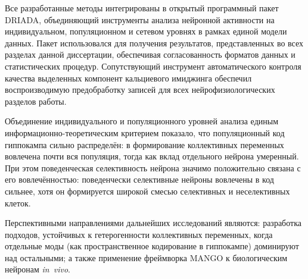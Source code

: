 Все разработанные методы интегрированы в открытый программный пакет DRIADA, объединяющий инструменты анализа нейронной активности на индивидуальном, популяционном и сетевом уровнях в рамках единой модели данных. Пакет использовался для получения результатов, представленных во всех разделах данной диссертации, обеспечивая согласованность форматов данных и статистических процедур. Сопутствующий инструмент автоматического контроля качества выделенных компонент кальциевого имиджинга обеспечил воспроизводимую предобработку записей для всех нейрофизиологических разделов работы.

Объединение индивидуального и популяционного уровней анализа единым информационно-теоретическим критерием показало, что популяционный код гиппокампа сильно распределён: в формирование коллективных переменных вовлечена почти вся популяция, тогда как вклад отдельного нейрона умеренный. При этом поведенческая селективность нейрона значимо положительно связана с его вовлечённостью: поведенчески селективные нейроны вовлечены в код сильнее, хотя он формируется широкой смесью селективных и неселективных клеток.

Перспективными направлениями дальнейших исследований являются: разработка подходов, устойчивых к гетерогенности коллективных переменных, когда отдельные моды (как пространственное кодирование в гиппокампе) доминируют над остальными; а также применение фреймворка MANGO к биологическим нейронам \textit{in~vivo}.
